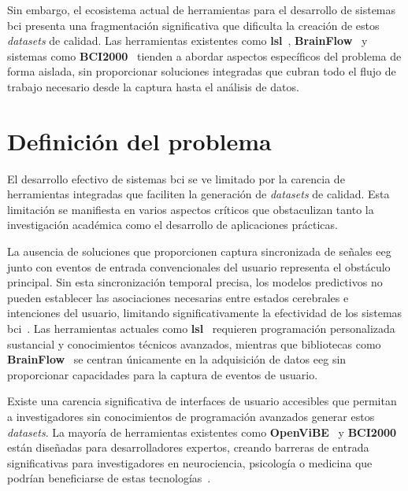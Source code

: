 Sin embargo, el ecosistema actual de herramientas para el desarrollo de sistemas \acrshort{bci} presenta una fragmentación significativa que dificulta la creación de estos \textit{\glspl{dataset}} de calidad. Las herramientas existentes como \textbf{\acrfull{lsl}}~\cite{kothe2013lab}, \textbf{BrainFlow}~\cite{brainflow} y sistemas como \textbf{BCI2000}~\cite{schalk2004bci2000} tienden a abordar aspectos específicos del problema de forma aislada, sin proporcionar soluciones integradas que cubran todo el flujo de trabajo necesario desde la captura hasta el análisis de datos.

\section{Definición del problema}
\label{sec:problema}

El desarrollo efectivo de sistemas \acrshort{bci} se ve limitado por la carencia de herramientas integradas que faciliten la generación de \textit{\glspl{dataset}} de calidad. Esta limitación se manifiesta en varios aspectos críticos que obstaculizan tanto la investigación académica como el desarrollo de aplicaciones prácticas.

La ausencia de soluciones que proporcionen captura sincronizada de señales \acrshort{eeg} junto con eventos de entrada convencionales del usuario representa el obstáculo principal. Sin esta sincronización temporal precisa, los modelos predictivos no pueden establecer las asociaciones necesarias entre estados cerebrales e intenciones del usuario, limitando significativamente la efectividad de los sistemas \acrshort{bci}~\cite{tangermann2012review,chavarriaga2017heading}. Las herramientas actuales como \textbf{\acrshort{lsl}}~\cite{kothe2013lab} requieren programación personalizada sustancial y conocimientos técnicos avanzados, mientras que bibliotecas como \textbf{BrainFlow}~\cite{brainflow} se centran únicamente en la adquisición de datos \acrshort{eeg} sin proporcionar capacidades para la captura de eventos de usuario.

Existe una carencia significativa de interfaces de usuario accesibles que permitan a investigadores sin conocimientos de programación avanzados generar estos \textit{\glspl{dataset}}. La mayoría de herramientas existentes como \textbf{OpenViBE}~\cite{openvibe} y \textbf{BCI2000}~\cite{schalk2004bci2000} están diseñadas para desarrolladores expertos, creando barreras de entrada significativas para investigadores en neurociencia, psicología o medicina que podrían beneficiarse de estas tecnologías~\cite{brunner2013bnci,tangermann2012review,sellers2006noninvasive}.


